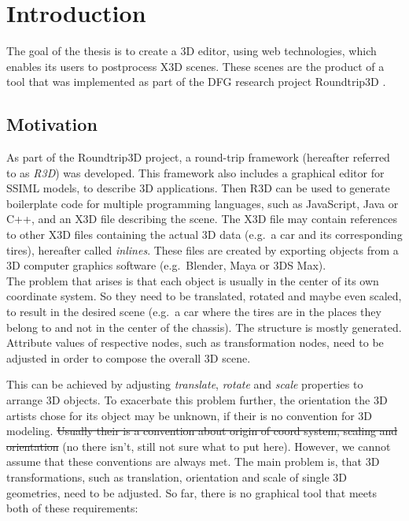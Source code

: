 
\section{Introduction}
\label{sec:Prelude}

The goal of the thesis is to create a 3D editor, using web technologies,
which enables its users to postprocess \gls{X3D} scenes. These scenes are the
product of a tool that was implemented as part of the DFG research
project \gls{Roundtrip3D} \cite{Jung:2015:SDA:2802768.2802837}.
\subsection{Motivation}\label{motivation}

As part of the Roundtrip3D project, a round-trip framework (hereafter
referred to as \emph{R3D}) was developed. This framework also includes a
graphical editor for SSIML models, to describe 3D applications. Then
\gls{R3D} can be used to generate boilerplate code for multiple programming
languages, such as JavaScript, Java or C++, and an \gls{X3D} file describing
the scene. The \gls{X3D} file may contain references to other \gls{X3D} files
containing the actual 3D data (e.g.~a car and its corresponding tires),
hereafter called \emph{inlines}. These files are created by exporting
objects from a 3D computer graphics software (e.g.~Blender,
Maya or 3DS Max).\\
The problem that arises is that each object is usually in the center of
its own coordinate system. So they need to be translated, rotated and
maybe even scaled, to result in the desired scene (e.g.~a car where the tires
are in the places they belong to and not in the center of the chassis).
The structure is mostly generated. Attribute values of respective nodes,
such as transformation nodes, need to be adjusted in order to compose the
overall 3D scene.


This can be achieved by adjusting \emph{translate}, \emph{rotate} and
\emph{scale} properties to arrange 3D objects. To exacerbate this problem
further, the orientation the 3D artists chose for its object may be unknown, if
their is no convention for 3D modeling. \sout{Usually their is a convention
about origin of coord system, scaling and orientation} (no there isn't, still
not sure what to put here). However, we cannot assume that these conventions are
always met. The main problem is, that 3D transformations, such as translation,
orientation and scale of single 3D geometries, need to be adjusted. So far,
there is no graphical tool that meets both of these requirements:

